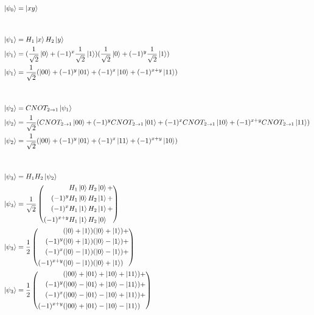 \documentclass{article}
\begin{document}
\begin{align*}
    \ket{\psi_0} &= \ket{xy} \\ \\ \\
    \ket{\psi_1} &= H_1\ket{x}H_2\ket{y} \\
    \ket{\psi_1} &= (\frac{1}{\sqrt{2}}\ket{0} + (-1)^x\frac{1}{\sqrt{2}}\ket{1})(\frac{1}{\sqrt{2}}\ket{0} + (-1)^y\frac{1}{\sqrt{2}}\ket{1}) \\
    \ket{\psi_1} &= \frac{1}{\sqrt{2}}(\ket{00} + (-1)^y\ket{01} + (-1)^x\ket{10} + (-1)^{x+y}\ket{11}) \\ \\ \\
    \ket{\psi_2} &= CNOT_{2\rightarrow1}\ket{\psi_1} \\
    \ket{\psi_2} &= \frac{1}{\sqrt{2}}(CNOT_{2\rightarrow1}\ket{00} + (-1)^yCNOT_{2\rightarrow1}\ket{01} + (-1)^xCNOT_{2\rightarrow1}\ket{10} + (-1)^{x+y}CNOT_{2\rightarrow1}\ket{11}) \\
    \ket{\psi_2} &= \frac{1}{\sqrt{2}}(\ket{00} + (-1)^y\ket{01} + (-1)^x\ket{11} + (-1)^{x+y}\ket{10}) \\ \\ \\
    \ket{\psi_3} &= H_1H_2\ket{\psi_2} \\
    \ket{\psi_3} &= \frac{1}{\sqrt{2}}\left(
        \begin{aligned}
            &H_1\ket{0}H_2\ket{0} + \\
            (-1)^y&H_1\ket{0}H_2\ket{1} + \\
            (-1)^x&H_1\ket{1}H_2\ket{1} + \\
            (-1)^{x+y}&H_1\ket{1}H_2\ket{0} \\
        \end{aligned}
    \right) \\
    \ket{\psi_3} &= \frac{1}{2}\left(
        \begin{aligned}
            &(\ket{0} + \ket{1})(\ket{0} + \ket{1}) + \\
            (-1)^y&(\ket{0} + \ket{1})(\ket{0} - \ket{1}) + \\
            (-1)^x&(\ket{0} - \ket{1})(\ket{0} - \ket{1}) + \\
            (-1)^{x+y}&(\ket{0} - \ket{1})(\ket{0} + \ket{1}) \\
        \end{aligned}
    \right) \\
    \ket{\psi_3} &= \frac{1}{2}\left(
        \begin{aligned}
            &(\ket{00} + \ket{01} + \ket{10} + \ket{11}) + \\
            (-1)^y&(\ket{00} - \ket{01} + \ket{10} - \ket{11}) + \\
            (-1)^x&(\ket{00} - \ket{01} - \ket{10} + \ket{11}) + \\
            (-1)^{x+y}&(\ket{00} + \ket{01} - \ket{10} - \ket{11}) \\
        \end{aligned}
    \right) \\
\end{align*}
\end{document}

